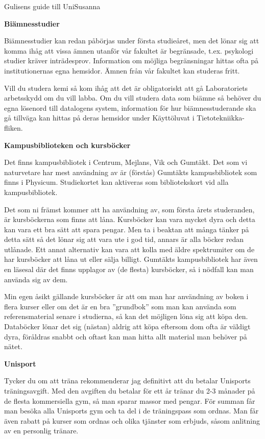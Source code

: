 \documentclass{spektraklet}
\begin{document}
\begin{artikel}{Gulisens guide till Uni}{Susanna}
\newpage

\textbf{Biämnesstudier}

Biämnesstudier kan redan påbörjas under första studieåret, men det lönar sig att komma ihåg att vissa ämnen utanför vår fakultet är begränsade, t.ex. psykologi studier kräver inträdesprov. Information om möjliga begränsningar hittas ofta på institutionernas egna hemsidor. Ämnen från vår fakultet kan studeras fritt.
 
Vill du studera kemi så kom ihåg att det är obligatoriskt att gå Laboratoriets arbetsskydd om du vill labba. Om du vill studera data som biämne så behöver du egna lösenord till datalogens system, information för hur biämnesstuderande ska gå tillväga kan hittas på deras hemsidor under Käyttöluvat i Tietotekniikka-fliken.


\textbf{Kampusbiblioteken och kursböcker}

Det finns kampusbibliotek i Centrum, Mejlans, Vik och Gumtäkt. Det som vi naturvetare har mest användning av är (förstås) Gumtäkts kampusbibliotek som finns i Physicum. Studiekortet kan aktiveras som bibliotekskort vid alla kampusbibliotek.

Det som ni främst kommer att ha användning av, som första årets studeranden, är kursböckerna som finns att låna. Kursböcker kan vara mycket dyra och detta kan vara ett bra sätt att spara pengar. Men ta i beaktan att många tänker på detta sätt så det lönar sig att vara ute i god tid, annars är alla böcker redan utlånade. Ett annat alternativ kan vara att kolla med äldre spektrumiter om de har kursböcker att låna ut eller sälja billigt. 
Gumtäkts kampusbibliotek har även en läsesal där det finns upplagor av (de flesta) kursböcker, så i nödfall kan man använda sig av dem. 

Min egen åsikt gällande kursböcker är att om man har användning av boken i flera kurser eller om det är en bra ”grundbok” som man kan använda som referensmaterial senare i studierna, så kan det möjligen löna sig att köpa den. Databöcker lönar det sig (nästan) aldrig att köpa eftersom dom ofta är väldigt dyra, föråldras snabbt och oftast kan man hitta allt material man behöver på nätet.

\textbf{Unisport}

Tycker du om att träna rekommenderar jag definitivt att du betalar Unisports träningsavgift. Med den avgiften du betalar för ett år tränar du 2-3 månader på de flesta kommersiella gym, så man sparar massor med pengar. För summan får man besöka alla Unisports gym och ta del i de träningspass som ordnas. Man får även rabatt på kurser som ordnas och olika tjänster som erbjuds, såsom anlitning av en personlig tränare. 


\end{artikel}
\end{document}
